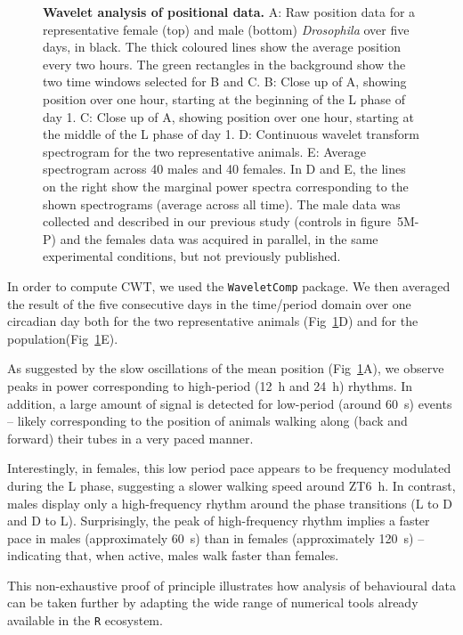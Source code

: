 \documentclass[10pt,letterpaper]{article}\usepackage[]{graphicx}\usepackage[]{color}
\begin{document}
\begin{figure}[!h]
	\caption{{\bf Wavelet analysis of positional data.}
		A: Raw position data for a representative female (top) and male (bottom) \emph{Drosophila} over five days, in black. 
		The thick coloured lines show the average position every two hours.
		The green rectangles in the background show the two time windows selected for B and C.
		B: Close up of A, showing position over one hour, starting at the beginning of the L phase of day 1.
		C: Close up of A, showing position over one hour, starting at the middle of the L phase of day 1.
		D: Continuous wavelet transform spectrogram for the two representative animals.
		E: Average spectrogram across 40 males and 40 females.
		In D and E, the lines on the right show the marginal power spectra corresponding to the shown spectrograms (average across all time).
		The male data was collected and described in our previous study \cite{geissmann_ethoscopes_2017} (controls in figure~5M-P) and the females data was acquired in parallel, in the same experimental conditions, but not previously published.
	}
	\label{fig:fig-6}
\end{figure}



In order to compute CWT, we used the \texttt{WaveletComp} package\cite{schmidbauer_waveletcomp_2018}.
We then averaged the result of the five consecutive days in the time/period domain over one circadian day both for the two representative animals (Fig~\ref{fig:fig-6}D)
and for the population(Fig~\ref{fig:fig-6}E).

As suggested by the slow oscillations of the mean position (Fig~\ref{fig:fig-6}A), we observe peaks in power corresponding to high-period (12~h and 24~h) rhythms.
In addition, a large amount of signal is detected for low-period (around 60~s) events -- 
likely corresponding to the position of animals walking along (back and forward) their tubes in a very paced manner.

Interestingly, in females, this low period pace appears to be frequency modulated during the L phase, suggesting a slower walking speed around ZT6~h.
In contrast, males display only a high-frequency rhythm around the phase transitions (L to D and D to L).
Surprisingly, the peak of high-frequency rhythm implies a faster pace in males (approximately 60~s) than in females (approximately 120~s) --
indicating that, when active, males walk faster than females. 

This non-exhaustive proof of principle illustrates how analysis of behavioural data can be taken further by adapting the wide range of numerical tools already available in the \texttt{R} ecosystem. 
\end{document}
